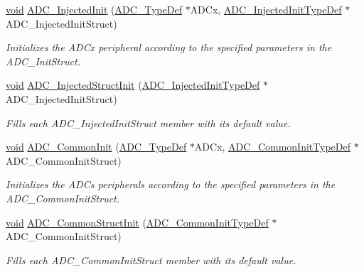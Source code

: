 \begin{DoxyCompactItemize}
\hyperlink{group___n_a_m_e_ga18028b8badbf1ea7e704ccac3c488e82}{void} \hyperlink{group___a_d_c___group1_gaecfd009a438d2f93ffbbb214a9809cbf}{A\-D\-C\-\_\-\-Injected\-Init} (\hyperlink{struct_a_d_c___type_def}{A\-D\-C\-\_\-\-Type\-Def} $\ast$A\-D\-Cx, \hyperlink{struct_a_d_c___injected_init_type_def}{A\-D\-C\-\_\-\-Injected\-Init\-Type\-Def} $\ast$A\-D\-C\-\_\-\-Injected\-Init\-Struct)
\begin{DoxyCompactList}\small\item\em Initializes the A\-D\-Cx peripheral according to the specified parameters in the A\-D\-C\-\_\-\-Init\-Struct. \end{DoxyCompactList}\item 
\hyperlink{group___n_a_m_e_ga18028b8badbf1ea7e704ccac3c488e82}{void} \hyperlink{group___a_d_c___group1_ga63b4c2f94f1ff519897199c894d28ca6}{A\-D\-C\-\_\-\-Injected\-Struct\-Init} (\hyperlink{struct_a_d_c___injected_init_type_def}{A\-D\-C\-\_\-\-Injected\-Init\-Type\-Def} $\ast$A\-D\-C\-\_\-\-Injected\-Init\-Struct)
\begin{DoxyCompactList}\small\item\em Fills each A\-D\-C\-\_\-\-Injected\-Init\-Struct member with its default value. \end{DoxyCompactList}\item 
\hyperlink{group___n_a_m_e_ga18028b8badbf1ea7e704ccac3c488e82}{void} \hyperlink{group___a_d_c___group1_ga0cdd00fe5c46fd826c3bf2ba2454b8b9}{A\-D\-C\-\_\-\-Common\-Init} (\hyperlink{struct_a_d_c___type_def}{A\-D\-C\-\_\-\-Type\-Def} $\ast$A\-D\-Cx, \hyperlink{struct_a_d_c___common_init_type_def}{A\-D\-C\-\_\-\-Common\-Init\-Type\-Def} $\ast$A\-D\-C\-\_\-\-Common\-Init\-Struct)
\begin{DoxyCompactList}\small\item\em Initializes the A\-D\-Cs peripherals according to the specified parameters in the A\-D\-C\-\_\-\-Common\-Init\-Struct. \end{DoxyCompactList}\item 
\hyperlink{group___n_a_m_e_ga18028b8badbf1ea7e704ccac3c488e82}{void} \hyperlink{group___a_d_c___group1_gad60a6414b4932c704f6f7a7c2963fa2a}{A\-D\-C\-\_\-\-Common\-Struct\-Init} (\hyperlink{struct_a_d_c___common_init_type_def}{A\-D\-C\-\_\-\-Common\-Init\-Type\-Def} $\ast$A\-D\-C\-\_\-\-Common\-Init\-Struct)
\begin{DoxyCompactList}\small\item\em Fills each A\-D\-C\-\_\-\-Common\-Init\-Struct member with its default value. \end{DoxyCompactList}\item 

\end{DoxyCompactItemize}
